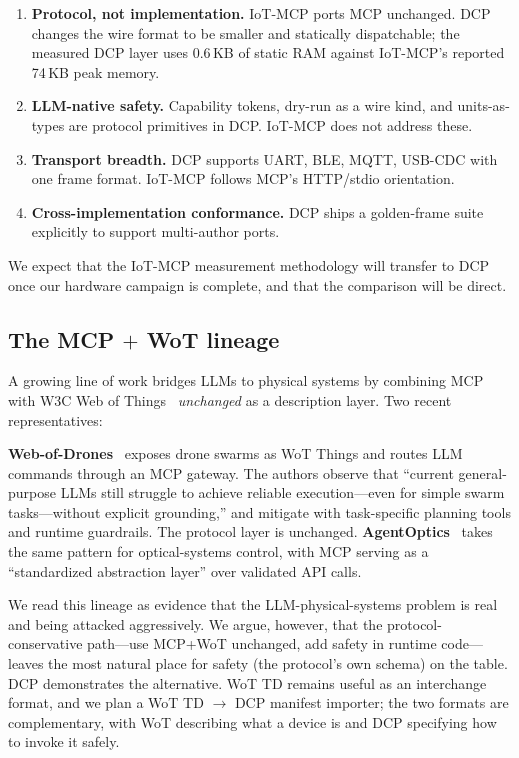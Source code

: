 \documentclass[11pt,a4paper]{article}
\begin{document}
\begin{enumerate}[leftmargin=*,nosep]
  \item \textbf{Protocol, not implementation.} IoT-MCP ports MCP unchanged.
        DCP changes the wire format to be smaller and statically
        dispatchable; the measured DCP layer uses 0.6\,KB of static RAM
        against IoT-MCP's reported 74\,KB peak memory.
  \item \textbf{LLM-native safety.} Capability tokens, dry-run as a wire
        kind, and units-as-types are protocol primitives in DCP. IoT-MCP
        does not address these.
  \item \textbf{Transport breadth.} DCP supports UART, BLE, MQTT, USB-CDC
        with one frame format. IoT-MCP follows MCP's HTTP/stdio orientation.
  \item \textbf{Cross-implementation conformance.} DCP ships a golden-frame
        suite explicitly to support multi-author ports.
\end{enumerate}

We expect that the IoT-MCP measurement methodology will transfer to DCP
once our hardware campaign is complete, and that the comparison will be
direct.

\subsection{The MCP $+$ WoT lineage}

A growing line of work bridges LLMs to physical systems by combining MCP
with W3C Web of Things~\cite{wot_td_2025} \emph{unchanged} as a description
layer. Two recent representatives:

\textbf{Web-of-Drones}~\cite{web_of_drones} exposes drone swarms as WoT
Things and routes LLM commands through an MCP gateway. The authors observe
that ``current general-purpose LLMs still struggle to achieve reliable
execution---even for simple swarm tasks---without explicit grounding,'' and
mitigate with task-specific planning tools and runtime guardrails. The
protocol layer is unchanged. \textbf{AgentOptics}~\cite{agentoptics} takes
the same pattern for optical-systems control, with MCP serving as a
``standardized abstraction layer'' over validated API calls.

We read this lineage as evidence that the LLM-physical-systems problem is
real and being attacked aggressively. We argue, however, that the
protocol-conservative path---use MCP+WoT unchanged, add safety in runtime
code---leaves the most natural place for safety (the protocol's own
schema) on the table. DCP demonstrates the alternative. WoT TD remains
useful as an interchange format, and we plan a WoT TD $\to$ DCP manifest
importer; the two formats are complementary, with WoT describing what a
device is and DCP specifying how to invoke it safely.
\end{document}
